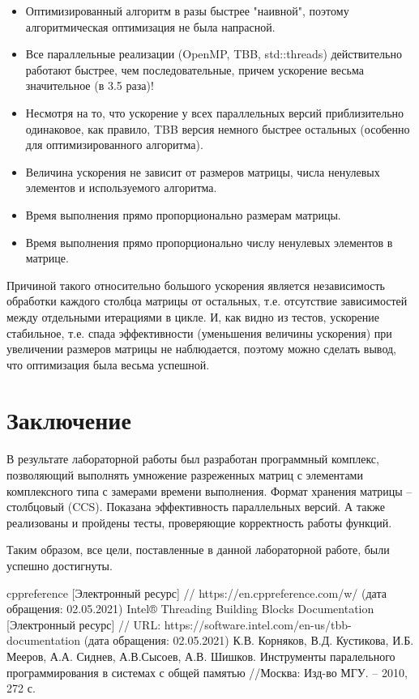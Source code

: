 \documentclass{report}
\begin{document}
	\begin{itemize}
		\item Оптимизированный алгоритм в разы быстрее "наивной"{}, поэтому алгоритмическая оптимизация не была напрасной.
		\item Все параллельные реализации (OpenMP, TBB, std::threads) действительно работают быстрее, чем последовательные, причем ускорение весьма значительное (в 3.5 раза)!
		\item Несмотря на то, что ускорение у всех параллельных версий приблизительно одинаковое, как правило, TBB версия немного быстрее остальных (особенно для оптимизированного алгоритма).
		\item Величина ускорения не зависит от размеров матрицы, числа ненулевых элементов и используемого алгоритма.
		\item Время выполнения прямо пропорционально размерам матрицы.
		\item Время выполнения прямо пропорционально числу ненулевых элементов в матрице.
	\end{itemize}
	\par Причиной такого относительно большого ускорения является независимость обработки каждого столбца матрицы от остальных, т.е. отсутствие зависимостей между отдельными итерациями в цикле. И, как видно из тестов, ускорение стабильное, т.е. спада эффективности (уменьшения величины ускорения) при увеличении размеров матрицы не наблюдается, поэтому можно сделать вывод, что оптимизация была весьма успешной.
	\newpage


	\section*{Заключение}
		\par В результате лабораторной работы был разработан программный комплекс, позволяющий выполнять умножение разреженных матриц с элементами комплексного типа с замерами времени выполнения. Формат хранения матрицы – столбцовый (CCS). Показана эффективность параллельных версий. А также реализованы и пройдены тесты, проверяющие корректность работы функций.
		\par Таким образом, все цели, поставленные в данной лабораторной работе, были успешно достигнуты.
	\newpage


	\begin{thebibliography}{1}
		 cppreference [Электронный ресурс] // https://en.cppreference.com/w/ (дата обращения: 02.05.2021)
         Intel® Threading Building Blocks Documentation [Электронный ресурс] // URL: https://software.intel.com/en-us/tbb-documentation (дата обращения: 02.05.2021)
		 К.В. Корняков, В.Д. Кустикова, И.Б. Мееров, А.А. Сиднев, А.В.Сысоев, А.В. Шишков. Инструменты паралельного программирования в системах с общей памятью //Москва: Изд-во МГУ. – 2010, 272 с.
	\end{thebibliography}
	\newpage
\end{document}

